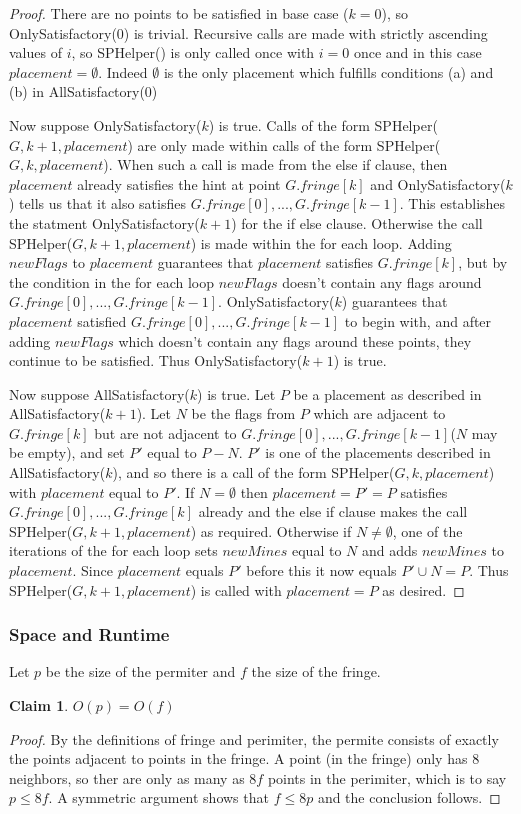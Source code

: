 \documentclass{article}
\theoremstyle{definition}
\theoremstyle{definition}
\theoremstyle{theorem}
\newtheorem{claim}{Claim}
\begin{document}
\begin{proof}
		There are no points to be satisfied in base case ($k = 0$), so OnlySatisfactory(0) is trivial. Recursive calls are made with strictly ascending values of $i$, so SPHelper() is only called once with $i = 0$ once and in this  case $placement = \emptyset$. Indeed $\emptyset$ is the only placement which fulfills conditions (a) and (b) in AllSatisfactory(0)
		
		Now suppose OnlySatisfactory($k$) is true. Calls of the form SPHelper($G,k+1,placement$) are only made within calls of the form SPHelper($G,k,placement$). When such a call is made from the else if clause, then $placement$ already satisfies the hint at point $G.fringe[k]$ and OnlySatisfactory($k$) tells us that it also satisfies $G.fringe[0], ..., G.fringe[k-1]$. This establishes the statment OnlySatisfactory($k+1$) for the if else clause. Otherwise the call SPHelper($G,k+1,placement$) is made within the for each loop. Adding $newFlags$ to $placement$ guarantees that $placement$ satisfies $G.fringe[k]$, but by the condition in the for each loop $newFlags$ doesn't contain any flags around $G.fringe[0], ..., G.fringe[k-1]$. OnlySatisfactory($k$) guarantees that $placement$ satisfied $G.fringe[0], ..., G.fringe[k-1]$ to begin with, and after adding $newFlags$ which doesn't contain any flags around these points, they continue to be satisfied. Thus OnlySatisfactory($k + 1$) is true.
		
		Now suppose AllSatisfactory($k$) is true. Let $P$ be a placement as described in AllSatisfactory($k+1$).  Let $N$ be the flags from $P$ which are adjacent to $G.fringe[k]$ but are not adjacent to $G.fringe[0], ..., G.fringe[k-1]$($N$ may be empty), and set $P'$ equal to $P - N$. $P'$ is one of the placements described in AllSatisfactory($k$), and so there is a call of the form SPHelper($G,k,placement$)  with $placement$ equal to $P'$. If $N = \emptyset$ then $placement = P' = P$ satisfies $G.fringe[0], ..., G.fringe[k]$ already and the else if clause makes the call SPHelper($G,k + 1,placement$) as required. Otherwise if $N \neq \emptyset$, one of the iterations of the for each loop sets $newMines$ equal to $N$ and adds $newMines$ to $placement$. Since $placement$ equals $P'$ before this it now equals $P' \cup N = P$. Thus SPHelper($G,k + 1,placement$) is called with $placement = P$ as desired.
	\end{proof}

	\subsubsection{Space and Runtime}
	Let $p$ be the size of the permiter and $f$ the size of the fringe.
	\begin{claim}
		$O(p) = O(f)$
	\end{claim}
	\begin{proof}
	By the definitions of fringe and perimiter, the permite consists of exactly the points adjacent to points in the fringe. A point (in the fringe) only has 8 neighbors, so ther are only as many as $8f$ points in the perimiter, which is to say $p \leq 8f$. A symmetric argument shows that $f \leq 8p$ and the conclusion follows.
	\end{proof}
	
\end{document}
